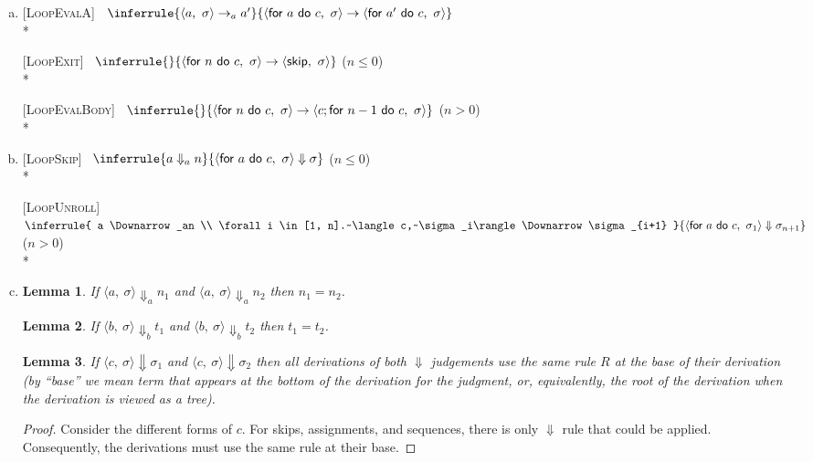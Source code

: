 \documentclass[10pt]{article}
\newcommand{\stepsA}{\rightarrow_a}
\newcommand{\steps}{\rightarrow}
\newcommand{\for}[2]{\textsf{for}~#1~\textsf{do}~#2}
\newcommand{\config}[2]{\langle#1,~#2\rangle}
\newcommand{\impSkip}{\textsf{skip}}
\newcommand{\bigStepsA}{\Downarrow_a}
\newcommand{\bigStepsB}{\Downarrow_b}
\newcommand{\bigSteps}{\Downarrow}
\newcommand{\Rule}[3]{
  [\textsc{#1}]~
  \label{rule:#1}
  \hfill
  \ensuremath{\inferrule{#2}{#3}}
  \hfill
}
\newcommand{\RuleWithCondition}[4]{
  [\textsc{#1}]~
  \label{rule:#1}
  \hfill
  \ensuremath{\inferrule{#2}{#3}}
  (#4)
  \hfill
}
\newtheorem{lemma}{Lemma}[claim]
\begin{document}
\begin{enumerate}[(a)]
  \item
  \Rule{LoopEvalA}{
    \config{a}{\sigma} \stepsA a'
  }{
    \config{\for{a}{c}}{\sigma} \steps \config{\for{a'}{c}}{\sigma}
  } \\*

  \RuleWithCondition{LoopExit}{}{
    \config{\for n c}{\sigma} \steps \config{\impSkip}{\sigma}
  }{$n \leq 0$} \\*

  \RuleWithCondition{LoopEvalBody}{}{
    \config{\for n c}{\sigma} \steps \config{c; \for{n - 1}{c}}{\sigma}
  }{$n > 0$} \\*

  \item
  \RuleWithCondition{LoopSkip}{
    a \bigStepsA n
  }{
    \config{\for a c}{\sigma} \bigSteps \sigma
  }{$n \leq 0$} \\*

  \RuleWithCondition{LoopUnroll}{
    a \bigStepsA n \\
    \forall i \in [1, n].~\config{c}{\sigma_i} \bigSteps \sigma_{i+1}
  }{
    \config{\for a c}{\sigma_1} \bigSteps \sigma_{n+1}
  }{$n > 0$} \\*

  \item
  \begin{lemma} \label{evalA}
    If   $\config{a}{\sigma} \bigStepsA n_1$
    and  $\config{a}{\sigma} \bigStepsA n_2$
    then $n_1 = n_2$.
  \end{lemma}

  \begin{lemma} \label{evalB}
    If   $\config{b}{\sigma} \bigStepsB t_1$
    and  $\config{b}{\sigma} \bigStepsB t_2$
    then $t_1 = t_2$.
  \end{lemma}

  \begin{lemma} \label{oneRule}
    If $\config{c}{\sigma} \bigSteps \sigma_1$
    and $\config{c}{\sigma} \bigSteps \sigma_2$
    then all derivations of both $\bigSteps$ judgements use the same rule $R$
    at the base of their derivation (by ``base'' we mean term that appears
    at the bottom of the derivation for the judgment, or, equivalently, the
    root of the derivation when the derivation is viewed as a tree).
  \end{lemma}

  \begin{proof}
    Consider the different forms of $c$. For skips, assignments, and
    sequences, there is only $\bigSteps$ rule that could be applied.
    Consequently, the derivations must use the same rule at their base.


\end{proof}
\end{enumerate}
\end{document}
